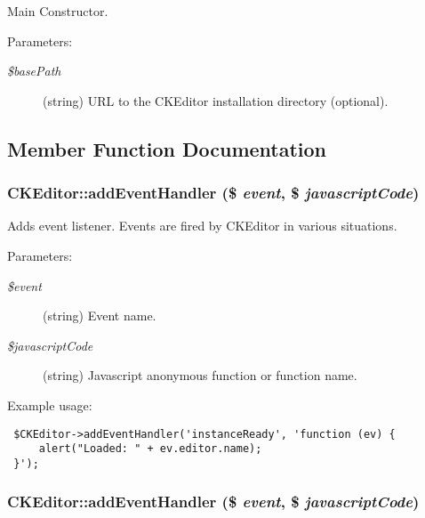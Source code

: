 Main Constructor.

\begin{Desc}
\item[Parameters:]
\begin{description}
\item[{\em \$basePath}](string) URL to the CKEditor installation directory (optional). \end{description}
\end{Desc}


\subsection{Member Function Documentation}
\hypertarget{classCKEditor_a9617d6c05e2ecca9f59b89e08dfc311}{
\subsubsection[{addEventHandler}]{\setlength{\rightskip}{0pt plus 5cm}CKEditor::addEventHandler (\$ {\em event}, \/  \$ {\em javascriptCode})}}
\label{classCKEditor_a9617d6c05e2ecca9f59b89e08dfc311}


Adds event listener. Events are fired by CKEditor in various situations.

\begin{Desc}
\item[Parameters:]
\begin{description}
\item[{\em \$event}](string) Event name. \item[{\em \$javascriptCode}](string) Javascript anonymous function or function name.\end{description}
\end{Desc}
Example usage: 

\begin{Code}\begin{verbatim} $CKEditor->addEventHandler('instanceReady', 'function (ev) {
     alert("Loaded: " + ev.editor.name);
 }');
\end{verbatim}
\end{Code}

 \hypertarget{classCKEditor_a9617d6c05e2ecca9f59b89e08dfc311}{
\subsubsection[{addEventHandler}]{\setlength{\rightskip}{0pt plus 5cm}CKEditor::addEventHandler (\$ {\em event}, \/  \$ {\em javascriptCode})}}
\label{classCKEditor_a9617d6c05e2ecca9f59b89e08dfc311}


